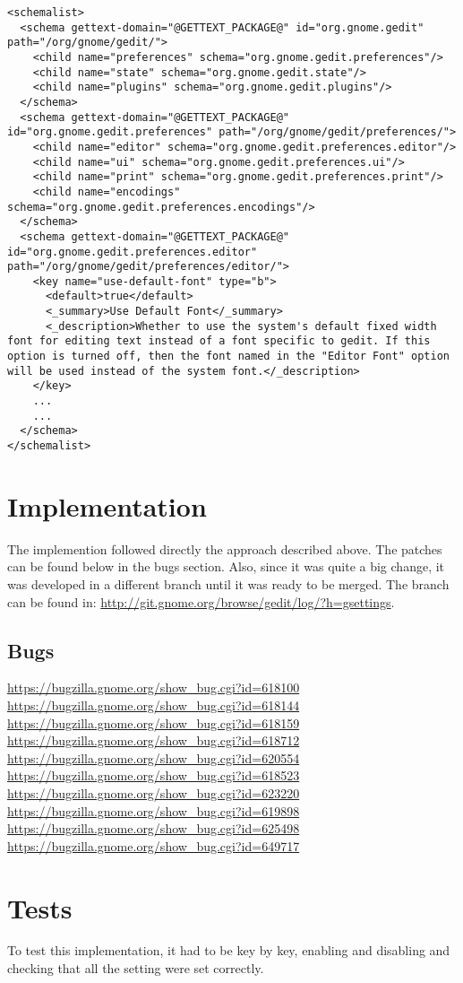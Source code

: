 \begin{lstlisting}[style=xml]
<schemalist>
  <schema gettext-domain="@GETTEXT_PACKAGE@" id="org.gnome.gedit" path="/org/gnome/gedit/">
    <child name="preferences" schema="org.gnome.gedit.preferences"/>
    <child name="state" schema="org.gnome.gedit.state"/>
    <child name="plugins" schema="org.gnome.gedit.plugins"/>
  </schema>
  <schema gettext-domain="@GETTEXT_PACKAGE@" id="org.gnome.gedit.preferences" path="/org/gnome/gedit/preferences/">
    <child name="editor" schema="org.gnome.gedit.preferences.editor"/>
    <child name="ui" schema="org.gnome.gedit.preferences.ui"/>
    <child name="print" schema="org.gnome.gedit.preferences.print"/>
    <child name="encodings" schema="org.gnome.gedit.preferences.encodings"/>
  </schema>
  <schema gettext-domain="@GETTEXT_PACKAGE@" id="org.gnome.gedit.preferences.editor" path="/org/gnome/gedit/preferences/editor/">
    <key name="use-default-font" type="b">
      <default>true</default>
      <_summary>Use Default Font</_summary>
      <_description>Whether to use the system's default fixed width font for editing text instead of a font specific to gedit. If this option is turned off, then the font named in the "Editor Font" option will be used instead of the system font.</_description>
    </key>
    ...
    ...
  </schema>
</schemalist>
\end{lstlisting}

\section{Implementation}

The  implemention followed directly the approach described above.  The patches 
can be found below in the bugs section. Also, since it was quite a big change, it was developed in a different 
branch until it was ready to be merged. The branch can be found in: \url{http://git.gnome.org/browse/gedit/log/?h=gsettings}.

\subsection{Bugs}

\noindent\url{https://bugzilla.gnome.org/show_bug.cgi?id=618100}\\
\noindent\url{https://bugzilla.gnome.org/show_bug.cgi?id=618144}\\
\noindent\url{https://bugzilla.gnome.org/show_bug.cgi?id=618159}\\
\noindent\url{https://bugzilla.gnome.org/show_bug.cgi?id=618712}\\
\noindent\url{https://bugzilla.gnome.org/show_bug.cgi?id=620554}\\
\noindent\url{https://bugzilla.gnome.org/show_bug.cgi?id=618523}\\
\noindent\url{https://bugzilla.gnome.org/show_bug.cgi?id=623220}\\
\noindent\url{https://bugzilla.gnome.org/show_bug.cgi?id=619898}\\
\noindent\url{https://bugzilla.gnome.org/show_bug.cgi?id=625498}\\
\noindent\url{https://bugzilla.gnome.org/show_bug.cgi?id=649717}

\section{Tests}

To test this implementation, it had to be key by key, enabling and disabling and checking that all the setting were set correctly.
